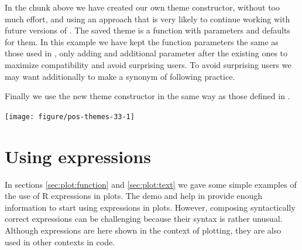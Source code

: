\documentclass[krantz2]{krantz}\usepackage{knitr}%
\begin{document}
\begin{explainbox}
In the chunk above we have created our own theme constructor, without too much effort, and using an approach that is very likely to continue working with future versions of \ggplot. The saved theme is a function with parameters and defaults for them. In this example we have kept the function parameters the same as those used in \ggplot, only adding and additional parameter after the existing ones to maximize compatibility and avoid surprising users. To avoid surprising users we may want additionally to make  a synonym of  following \ggplot practice.

\begin{knitrout}\footnotesize
{}\color{fgcolor}\begin{kframe}
\begin{alltt}
 \hlkwb{<-} 
\end{alltt}
\end{kframe}
\end{knitrout}

Finally we use the new theme constructor in the same way as those defined in \ggplot.

\begin{knitrout}\footnotesize
{}\color{fgcolor}\begin{kframe}
\begin{alltt}
 \hlopt{+} \hlstd{(}\hlstd{,}  \hlstd{=} \hlstd{)}
\end{alltt}
\end{kframe}

{\centering \texttt{[image: figure/pos-themes-33-1]} 

}



\end{knitrout}
\end{explainbox}

\section[Using plotmath expressions]{Using  expressions}\label{sec:plot:plotmath}
In sections \ref{sec:plot:function} and \ref{sec:plot:text} we gave some simple examples of the use of R expressions in plots. The  demo and help in \Rlang provide enough information to start using expressions in plots. However, composing syntactically correct expressions can be challenging because their syntax is rather unusual. Although expressions are here shown in the context of plotting, they are also used in other contexts in \Rlang code.
\end{document}
